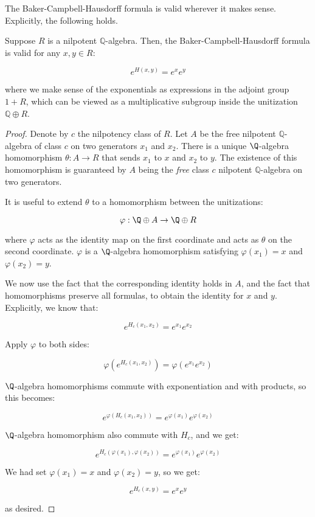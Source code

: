 \documentclass{ucetd}
\begin{document}
The Baker-Campbell-Hausdorff formula is valid wherever it makes
sense. Explicitly, the following holds.

\begin{theorem}\label{thm:bch-universal-validity-rationals}
  Suppose $R$ is a nilpotent $\mathbb{Q}$-algebra. Then, the
  Baker-Campbell-Hausdorff formula is valid for any $x,y \in R$:

  $$e^{H(x,y)} = e^xe^y$$

  where we make sense of the exponentials as expressions in the
  adjoint group $1 + R$, which can be viewed as a multiplicative
  subgroup inside the unitization $\mathbb{Q} \oplus R$.
\end{theorem}

\begin{proof}
  Denote by $c$ the nilpotency class of $R$. Let $A$ be the free
  nilpotent $\mathbb{Q}$-algebra of class $c$ on two generators $x_1$
  and $x_2$. There is a unique $\Q$-algebra homomorphism $\theta:A
  \to R$ that sends $x_1$ to $x$ and $x_2$ to
  $y$. The existence of this homomorphism is guaranteed by $A$ being
  the {\em free} class $c$ nilpotent $\mathbb{Q}$-algebra on two
  generators.

  It is useful to extend $\theta$ to a homomorphism between the unitizations:

  $$\varphi: \Q \oplus A \to \Q \oplus R$$

  where $\varphi$ acts as the identity map on the first coordinate and
  acts as $\theta$ on the second coordinate. $\varphi$ is a
  $\Q$-algebra homomorphism satisfying $\varphi(x_1) = x$ and
  $\varphi(x_2) = y$.
  
  We now use the fact that the corresponding identity holds in $A$,
  and the fact that homomorphisms preserve all formulas, to obtain the
  identity for $x$ and $y$. Explicitly, we know that:

  $$e^{H_c(x_1,x_2)} = e^{x_1}e^{x_2}$$

  Apply $\varphi$ to both sides:
  
  $$\varphi(e^{H_c(x_1,x_2)}) = \varphi(e^{x_1}e^{x_2})$$

  $\Q$-algebra homomorphisms commute with exponentiation and with
  products, so this becomes:
  
  $$e^{\varphi(H_c(x_1,x_2))} = e^{\varphi(x_1)}e^{\varphi(x_2)}$$
  
  $\Q$-algebra homomorphism also commute with $H_c$, and we get:
  
  $$e^{H_c(\varphi(x_1),\varphi(x_2))} = e^{\varphi(x_1)}e^{\varphi(x_2)}$$
  
  We had set $\varphi(x_1) = x$ and $\varphi(x_2) = y$, so we get:
  
  $$e^{H_c(x,y)} = e^xe^y$$

  as desired.
\end{proof}
\end{document}

